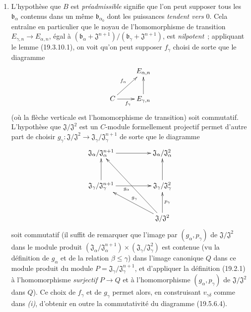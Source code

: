 \begin{env}[19.5.6.4]
\begin{enumerate}
  \item[\rm(ii)] L'hypothèse que $B$ est \emph{préadmissible} signifie que
  l'on peut supposer tous les $\mathfrak b_\alpha$ contenus dans un même
  $\mathfrak b_{\alpha_0}$ dont les puissances \emph{tendent vers} $0$. Cela
  entraîne en particulier que le noyau de l'homomorphisme de transition
  $E_{\gamma,n}\to E_{\alpha,n}$, égal à
  $(\mathfrak b_\alpha+\mathfrak J^{n+1})/
  (\mathfrak b_\gamma+\mathfrak J^{n+1})$, est \emph{nilpotent}~; appliquant le
  lemme (19.3.10.1), on voit qu'on peut supposer $f_\gamma$ choisi de sorte que
  le diagramme
  \[
    \xymatrix{
      & E_{\alpha,n} \\
      C \ar[ur]^{f_\alpha} \ar[r]_{f_\gamma} & E_{\gamma,n} \ar[u]
    }
  \]
  (où la flèche verticale est l'homomorphisme de transition) soit commutatif.
  L'hypothèse que $\mathfrak J/\mathfrak J^2$ est un $C$-module formellement
  projectif permet d'autre part de choisir
  $g_\gamma:\mathfrak J/\mathfrak J^2\to
  \mathfrak J_\gamma/\mathfrak J_\gamma^{n+1}$ de sorte que le diagramme
  \[
    \xymatrix@C=5em@R=3em{
      \mathfrak J_\alpha/\mathfrak J_\alpha^{n+1} \ar[r] &
      \mathfrak J_\alpha/\mathfrak J_\alpha^2 \\
      \mathfrak J_\gamma/\mathfrak J_\gamma^{n+1} \ar[u] \ar[r] &
      \mathfrak J_\gamma/\mathfrak J_\gamma^2 \ar[u] \\
      & \mathfrak J/\mathfrak J^2
        \ar[ul]_{g_\gamma} \ar[u]_{p_\gamma} \ar[uul]^{g_\alpha}
    }
  \]
  soit commutatif (il suffit de remarquer que l'image par $(g_\alpha,p_\gamma)$
  de $\mathfrak J/\mathfrak J^2$ dans le module produit
  $(\mathfrak J_\alpha/\mathfrak J_\alpha^{n+1})
  \times(\mathfrak J_\gamma/\mathfrak J_\gamma^2)$ est contenue (vu la
  définition de $g_\alpha$ et de la relation $\beta\leq\gamma$) dans l'image
  canonique $Q$ dans ce module produit du module
  $P=\mathfrak J_\gamma/\mathfrak J_\gamma^{n+1}$, et d'appliquer la définition
  (19.2.1) à l'homomorphisme \emph{surjectif} $P\to Q$ et à l'homomorphisme
  $(g_\alpha,p_\gamma)$ de $\mathfrak J/\mathfrak J^2$ dans $Q$). Ce choix de
  $f_\gamma$ et de $g_\gamma$ permet alors, en construisant
  $v_{\gamma\delta}$ comme dans \emph{(i)}, d'obtenir en outre la commutativité
  du diagramme (19.5.6.4).
\end{enumerate}
\end{env}


